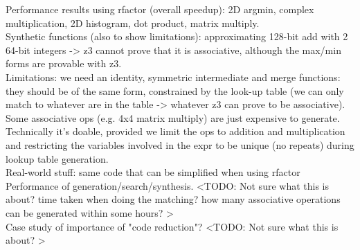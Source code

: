 Performance results using rfactor (overall speedup): 2D argmin, complex multiplication, 2D histogram, dot product, matrix multiply. \\

Synthetic functions (also to show limitations): approximating 128-bit add with 2 64-bit integers -> z3 cannot prove that it is associative, although the max/min forms are provable with z3. \\

Limitations: we need an identity, symmetric intermediate and merge functions: they should be of the same form, constrained by the look-up table (we can only match to whatever are in the table -> whatever z3 can prove to be associative). Some associative ops (e.g. 4x4 matrix multiply) are just expensive to generate. Technically it's doable, provided we limit the ops to addition and multiplication and restricting the variables involved in the expr to be unique (no repeats) during lookup table generation. \\

Real-world stuff: same code that can be simplified when using rfactor \\

Performance of generation/search/synthesis. <TODO: Not sure what this is about? time taken when doing the matching? how many associative operations can be generated within some hours? > \\

Case study of importance of "code reduction"? <TODO: Not sure what this is about? > \\ 